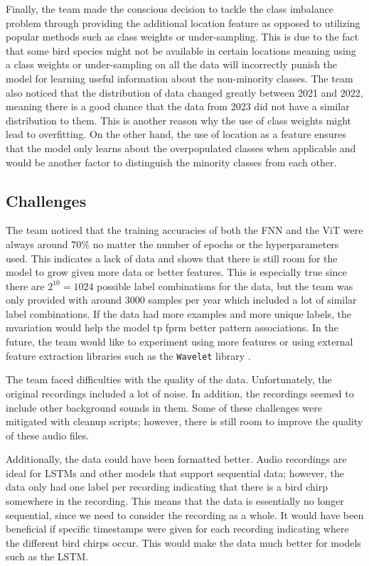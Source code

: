 \documentclass[12pt, conference]{IEEEtran}
\begin{document}
Finally, the team made the conscious decision to tackle the class imbalance problem through providing the additional location feature as opposed to utilizing popular methods such as class weights or under-sampling. This is due to the fact that some bird species might not be available in certain locations meaning using a class weights or under-sampling on all the data will incorrectly punish the model for learning useful information about the non-minority classes. The team also noticed that the distribution of data changed greatly between 2021 and 2022, meaning there is a good chance that the data from 2023 did not have a similar distribution to them. This is another reason why the use of class weights might lead to overfitting. On the other hand, the use of location as a feature ensures that the model only learns about the overpopulated classes when applicable and would be another factor to distinguish the minority classes from each other.

\subsection{Challenges}
The team noticed that the training accuracies of both the FNN and the ViT were always around $70\%$ no matter the number of epochs or the hyperparameters used. This indicates a lack of data and shows that there is still room for the model to grow given more data or better features. This is especially true since there are $2^{10} = 1024$ possible label combinations for the data, but the team was only provided with around 3000 samples per year which included a lot of similar label combinations. If the data had more examples and more unique labels, the mvariation would help the model tp fprm better pattern associations. In the future, the team would like to experiment using more features or using external feature extraction libraries such as the \texttt{Wavelet} library \cite{wavelet}.

The team faced difficulties with the quality of the data. Unfortunately, the original recordings included a lot of noise. In addition, the recordings seemed to include other background sounds in them. Some of these challenges were mitigated with cleanup scripts; however, there is still room to improve the quality of these audio files.

Additionally, the data could have been formatted better. Audio recordings are ideal for LSTMs and other models that support sequential data; however, the data only had one label per recording indicating that there is a bird chirp somewhere in the recording. This means that the data is essentially no longer sequential, since we need to consider the recording as a whole. It would have been beneficial if specific timestamps were given for each recording indicating where the different bird chirps occur. This would make the data much better for models such as the LSTM.
\end{document}
